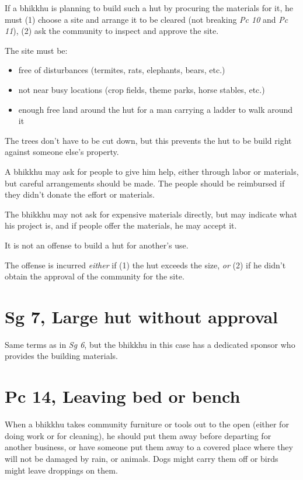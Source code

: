 If a bhikkhu is planning to build such a hut by procuring the materials
for it, he must (1) choose a site and arrange it to be cleared (not
breaking \emph{Pc 10} and \emph{Pc 11}), (2) ask the community to
inspect and approve the site.

The site must be:

\begin{itemize}
\tightlist
\item
  free of disturbances (termites, rats, elephants, bears, etc.)
\item
  not near busy locations (crop fields, theme parks, horse stables,
  etc.)
\item
  enough free land around the hut for a man carrying a ladder to walk
  around it
\end{itemize}

The trees don't have to be cut down, but this prevents the hut to be
build right against someone else's property.

A bhikkhu may ask for people to give him help, either through labor or
materials, but careful arrangements should be made. The people should be
reimbursed if they didn't donate the effort or materials.

The bhikkhu may not ask for expensive materials directly, but may
indicate what his project is, and if people offer the materials, he may
accept it.

It is not an offense to build a hut for another's use.

The offense is incurred \emph{either} if (1) the hut exceeds the size,
\emph{or} (2) if he didn't obtain the approval of the community for the
site.

\section{Sg 7, Large hut without approval}

Same terms as in \emph{Sg 6}, but the bhikkhu in this case has a
dedicated sponsor who provides the building materials.

\section{Pc 14, Leaving bed or bench}

When a bhikkhu takes community furniture or tools out to the open
(either for doing work or for cleaning), he should put them away before
departing for another business, or have someone put them away to a
covered place where they will not be damaged by rain, or animals. Dogs
might carry them off or birds might leave droppings on them.

